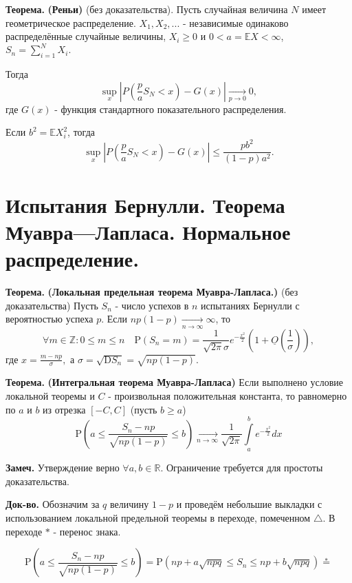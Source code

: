 \documentclass[oneside,final,14pt]{extreport}
\newcommand\mynote{{\bf Замеч.}}
\newcommand\myth{{\bf Теорема.}}
\newcommand\myqed{{\bf Док-во.}}
\theoremstyle{definition}
\begin{document}
\myth{} \textbf{(Реньи)} (без доказательства). Пусть случайная величина $N$ имеет геометрическое распределение. $X_1, X_2, ...$ - независимые одинаково распределённые случайные величины, $X_i \geqslant 0$ и $0 < a = \mathbb{E}X < \infty$, $S_n = \sum\limits_{i=1}^N X_i.$

Тогда $$\sup _{x}\left|P\left(\frac{p}{a} S_{N}<x\right)-G(x)\right| \underset{p \rightarrow 0}{\longrightarrow} 0,$$
где $G(x)$ - функция стандартного показательного распределения.

Если $b^2 = \mathbb{E}X_i^2$, тогда $$\sup_{x}\left|P\left(\frac{p}{a} S_{N}<x\right)-G(x)\right| \leqslant \frac{p b^{2}}{(1-p) a^{2}}.$$
 
\section{Испытания Бернулли. Теорема Муавра—Лапласа. Нормальное распределение.}

\myth{} \textbf{(Локальная предельная теорема Муавра-Лапласа.)} (без доказательства) Пусть $S_n$ - число успехов в $n$ испытаниях Бернулли с вероятностью успеха $p$. Если $n p(1-p) \underset{n \to \infty}{\longrightarrow} \infty$, то
$$\forall m \in \mathbb{Z}: 0 \leqslant m \leqslant n \quad \mathrm{P}\left(S_{n}=m\right)=\frac{1}{\sqrt{2 \pi} \sigma} e^{-\frac{x^{2}}{2}}\left(1+\underline{O}\left(\frac{1}{\sigma}\right)\right),$$
где $x = \frac{m - np}{\sigma},$ а $\sigma=\sqrt{\mathrm{D} S_{n}}=\sqrt{n p(1-p)}$.

\myth{} \textbf{(Интегральная теорема Муавра-Лапласа)} Если выполнено условие локальной теоремы и $C$ - произвольная положительная константа, то равномерно по $a$ и $b$ из отрезка $[-C,C]$ (пусть $b \geqslant a$)
$$\mathrm{P}\left(a \leqslant \frac{S_{n}-n p}{\sqrt{n p(1-p)}} \leqslant b\right) \underset{n \to \infty}{\longrightarrow} \frac{1}{\sqrt{2 \pi}} \int\limits_{a}^{b} e^{-\frac{x^{2}}{2}} d x$$

\mynote{} Утверждение верно $\forall a,b \in \mathbb{R}$. Ограничение требуется для простоты доказательства.

\myqed{} Обозначим за $q$ величину $1 - p$ и проведём небольшие выкладки с использованием локальной предельной теоремы в переходе, помеченном $\triangle$. В переходе $*$ - перенос знака.

$$\mathrm{P}\left(a \leqslant \frac{S_{n}-n p}{\sqrt{n p(1-p)}} \leqslant b\right)=\mathrm{P}\left(n p+a \sqrt{n p q} \leqslant S_{n} \leqslant n p+b \sqrt{n p q}\right) \stackrel{*}{=}$$
\end{document}
